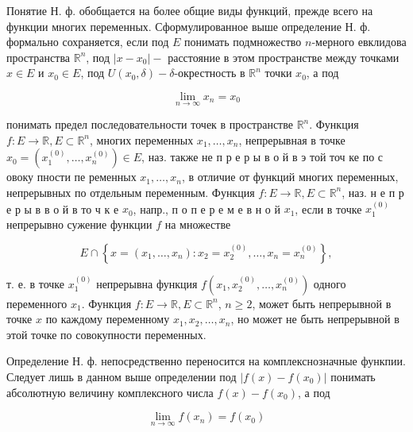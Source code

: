\documentclass[10pt]{article}
\begin{document}
Понятие Н. ф. обобщается на более общие виды функций, прежде всего на функции многих переменных. Сформулированное выше определение Н. ф. формально сохраняется, если под $E$ понимать подмножество $n$-мерного евклидова пространства $\mathbb{R}^{n}$, под $\left|x-x_{0}\right|-$ расстояние в этом пространстве между точками $x \in E$ и $x_{0} \in E$, под $U\left(x_{0}, \delta\right)-\delta$-окрестность в $\mathbb{R}^{n}$ точки $x_{0}$, а под



\[

\lim _{n \rightarrow \infty} x_{n}=x_{0}

\]



понимать предел последовательности точек в пространстве $\mathbb{R}^{n}$. Функция $f: E \rightarrow \mathbb{R}, E \subset \mathbb{R}^{n}$, многих переменных $x_{1}, \ldots, x_{n}$, непрерывная в точке $x_{0}=\left(x_{1}^{(0)}, \ldots, x_{n}^{(0)}\right) \in E$, наз. также не п р е р ы в о й в э той точ ке по с овоку пности пе ременных $x_{1}, \ldots, x_{n}$, в отличие от функций многих переменных, непрерывных по отдельным переменным. Функция $f: E \rightarrow \mathbb{R}, E \subset \mathbb{R}^{n}$, наз. н е п р е р ы в в о й в то ч к е $x_{0}$, напр., п о п е р е м е в н о й $x_{1}$, если в точке $x_{1}^{(0)}$ непрерывно сужение функции $f$ на множестве



\[

E \cap\left\{x=\left(x_{1}, \ldots, x_{n}\right): x_{2}=x_{2}^{(0)}, \ldots, x_{n}=x_{n}^{(0)}\right\},

\]



т. е. в точке $x_{1}^{(0)}$ непрерывна функция $f\left(x_{1}, x_{2}^{(0)}, \ldots, x_{n}^{(0)}\right)$ одного переменного $x_{1}$. Функция $f: E \rightarrow \mathbb{R}, E \subset \mathbb{R}^{n}$, $n \geqslant 2$, может быть непрерывной в точке $x$ по каждому переменному $x_{1}, x_{2}, \ldots, x_{n}$, но может не быть непрерывной в этой точке по совокупности переменных.



Определение Н. ф. непосредственно переносится на комплекснозначные функпии. Следует лишь в данном выше определении под $\left|f(x)-f\left(x_{0}\right)\right|$ понимать абсолютную величину комплексного числа $f(x)-f\left(x_{0}\right)$, а под



\[

\lim _{n \rightarrow \infty} f\left(x_{n}\right)=f\left(x_{0}\right)

\]
\end{document}
